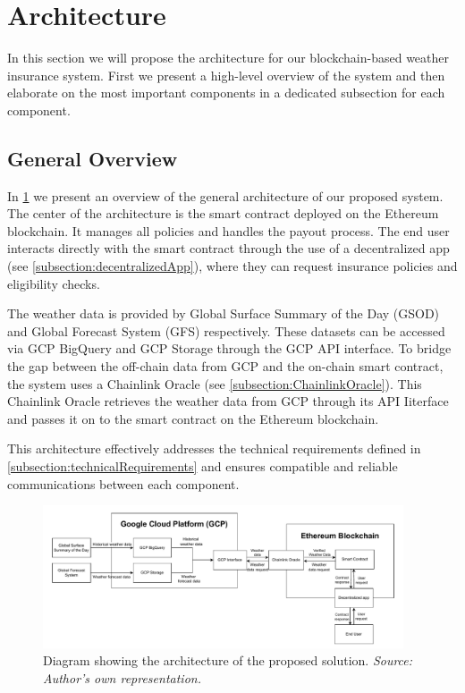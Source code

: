 \section{Architecture}

In this section we will propose the architecture for our blockchain-based weather insurance system. First we present a high-level overview of the system and then elaborate on the most important components in a dedicated subsection for each component.

\subsection{General Overview}\label{subsection:generalOverview}

In \cref{fig:generalArchitecture} we present an overview of the general architecture of our proposed system. The center of the architecture is the smart contract deployed on the Ethereum blockchain. It manages all policies and handles the payout process. The end user interacts directly with the smart contract through the use of a decentralized app (see \cref{subsection:decentralizedApp}), where they can request insurance policies and eligibility checks.

The weather data is provided by Global Surface Summary of the Day (GSOD) and Global Forecast System (GFS) respectively. These datasets can be accessed via GCP BigQuery and GCP Storage through the GCP API interface. To bridge the gap between the off-chain data from GCP and the on-chain smart contract, the system uses a Chainlink Oracle (see \cref{subsection:ChainlinkOracle}). This Chainlink Oracle retrieves the weather data from GCP through its API Iiterface and passes it on to the smart contract on the Ethereum blockchain.

This architecture effectively addresses the technical requirements defined in \cref{subsection:technicalRequirements} and ensures compatible and reliable communications between each component.

\begin{figure}[h]
    \centering
    \includegraphics[width=0.95\textwidth]{figures/architecture-overview.drawio.pdf}
    \caption{Diagram showing the architecture of the proposed solution. \textit{Source: Author's own representation.}}
    \label{fig:generalArchitecture}
\end{figure}

